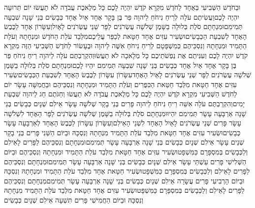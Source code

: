 \documentclass[../main/main.tex]{subfiles}
\begin{document}
\begin{multicols}{\ncols}
וּבַחֹדֶשׁ הַשְּׁבִיעִי בְּאֶחָד לַחֹדֶשׁ מִקְרָא קֹדֶשׁ יִהְיֶה לָכֶם כָּל מְלֶאכֶת עֲבֹדָה לֹא תַעֲשׂוּ יוֹם תְּרוּעָה יִהְיֶה לָכֶם\PreVerseSpace{}וַעֲשִׂיתֶם עֹלָה לְרֵיחַ נִיחֹחַ לַיהוָה פַּר בֶּן בָּקָר אֶחָד אַיִל אֶחָד כְּבָשִׂים בְּנֵי שָׁנָה שִׁבְעָה תְּמִימִם\PreVerseSpace{}וּמִנְחָתָם סֹלֶת בְּלוּלָה בַשָּׁמֶן שְׁלֹשָׁה עֶשְׂרֹנִים לַפָּר שְׁנֵי עֶשְׂרֹנִים לָאָיִל\PreVerseSpace{}וְעִשָּׂרוֹן אֶחָד לַכֶּבֶשׂ הָאֶחָד לְשִׁבְעַת הַכְּבָשִׂים\PreVerseSpace{}וּשְׂעִיר עִזִּים אֶחָד חַטָּאת לְכַפֵּר עֲלֵיכֶם\PreVerseSpace{}מִלְּבַד עֹלַת הַחֹדֶשׁ וּמִנְחָתָהּ וְעֹלַת הַתָּמִיד וּמִנְחָתָהּ וְנִסְכֵּיהֶם כְּמִשְׁפָּטָם לְרֵיחַ נִיחֹחַ אִשֶּׁה לַיהוָה \ClosedSection{}וּבֶעָשׂוֹר לַחֹדֶשׁ הַשְּׁבִיעִי הַזֶּה מִקְרָא קֹדֶשׁ יִהְיֶה לָכֶם וְעִנִּיתֶם אֶת נַפְשֹׁתֵיכֶם כָּל מְלָאכָה לֹא תַעֲשׂוּ\PreVerseSpace{}וְהִקְרַבְתֶּם עֹלָה לַיהוָה רֵיחַ נִיחֹחַ פַּר בֶּן בָּקָר אֶחָד אַיִל אֶחָד כְּבָשִׂים בְּנֵי שָׁנָה שִׁבְעָה תְּמִימִם יִהְיוּ לָכֶם\PreVerseSpace{}וּמִנְחָתָם סֹלֶת בְּלוּלָה בַשָּׁמֶן שְׁלֹשָׁה עֶשְׂרֹנִים לַפָּר שְׁנֵי עֶשְׂרֹנִים לָאַיִל הָאֶחָד\PreVerseSpace{}עִשָּׂרוֹן עִשָּׂרוֹן לַכֶּבֶשׂ הָאֶחָד לְשִׁבְעַת הַכְּבָשִׂים\PreVerseSpace{}שְׂעִיר עִזִּים אֶחָד חַטָּאת מִלְּבַד חַטַּאת הַכִּפֻּרִים וְעֹלַת הַתָּמִיד וּמִנְחָתָהּ וְנִסְכֵּיהֶם \ClosedSection{}וּבַחֲמִשָּׁה עָשָׂר יוֹם לַחֹדֶשׁ הַשְּׁבִיעִי מִקְרָא קֹדֶשׁ יִהְיֶה לָכֶם כָּל מְלֶאכֶת עֲבֹדָה לֹא תַעֲשׂוּ וְחַגֹּתֶם חַג לַיהוָה שִׁבְעַת יָמִים\PreVerseSpace{}וְהִקְרַבְתֶּם עֹלָה אִשֵּׁה רֵיחַ נִיחֹחַ לַיהוָה פָּרִים בְּנֵי בָקָר שְׁלֹשָׁה עָשָׂר אֵילִם שְׁנָיִם כְּבָשִׂים בְּנֵי שָׁנָה אַרְבָּעָה עָשָׂר תְּמִימִם יִהְיוּ\PreVerseSpace{}וּמִנְחָתָם סֹלֶת בְּלוּלָה בַשָּׁמֶן שְׁלֹשָׁה עֶשְׂרֹנִים לַפָּר הָאֶחָד לִשְׁלֹשָׁה עָשָׂר פָּרִים שְׁנֵי עֶשְׂרֹנִים לָאַיִל הָאֶחָד לִשְׁנֵי הָאֵילִם\PreVerseSpace{}וְעִשָּׂרוֹן עִשָּׂרוֹן לַכֶּבֶשׂ הָאֶחָד לְאַרְבָּעָה עָשָׂר כְּבָשִׂים\PreVerseSpace{}וּשְׂעִיר עִזִּים אֶחָד חַטָּאת מִלְּבַד עֹלַת הַתָּמִיד מִנְחָתָהּ וְנִסְכָּהּ \ClosedSection{}וּבַיּוֹם הַשֵּׁנִי פָּרִים בְּנֵי בָקָר שְׁנֵים עָשָׂר אֵילִם שְׁנָיִם כְּבָשִׂים בְּנֵי שָׁנָה אַרְבָּעָה עָשָׂר תְּמִימִם\PreVerseSpace{}וּמִנְחָתָם וְנִסְכֵּיהֶם לַפָּרִים לָאֵילִם וְלַכְּבָשִׂים בְּמִסְפָּרָם כַּמִּשְׁפָּט\PreVerseSpace{}וּשְׂעִיר עִזִּים אֶחָד חַטָּאת מִלְּבַד עֹלַת הַתָּמִיד וּמִנְחָתָהּ וְנִסְכֵּיהֶם \ClosedSection{}וּבַיּוֹם הַשְּׁלִישִׁי פָּרִים עַשְׁתֵּי עָשָׂר אֵילִם שְׁנָיִם כְּבָשִׂים בְּנֵי שָׁנָה אַרְבָּעָה עָשָׂר תְּמִימִם\PreVerseSpace{}וּמִנְחָתָם וְנִסְכֵּיהֶם לַפָּרִים לָאֵילִם וְלַכְּבָשִׂים בְּמִסְפָּרָם כַּמִּשְׁפָּט\PreVerseSpace{}וּשְׂעִיר חַטָּאת אֶחָד מִלְּבַד עֹלַת הַתָּמִיד וּמִנְחָתָהּ וְנִסְכָּהּ \ClosedSection{}וּבַיּוֹם הָרְבִיעִי פָּרִים עֲשָׂרָה אֵילִם שְׁנָיִם כְּבָשִׂים בְּנֵי שָׁנָה אַרְבָּעָה עָשָׂר תְּמִימִם\PreVerseSpace{}מִנְחָתָם וְנִסְכֵּיהֶם לַפָּרִים לָאֵילִם וְלַכְּבָשִׂים בְּמִסְפָּרָם כַּמִּשְׁפָּט\PreVerseSpace{}וּשְׂעִיר עִזִּים אֶחָד חַטָּאת מִלְּבַד עֹלַת הַתָּמִיד מִנְחָתָהּ וְנִסְכָּהּ \ClosedSection{}וּבַיּוֹם הַחֲמִישִׁי פָּרִים תִּשְׁעָה אֵילִם שְׁנָיִם כְּבָשִׂים 
\end{multicols}
\end{document}
